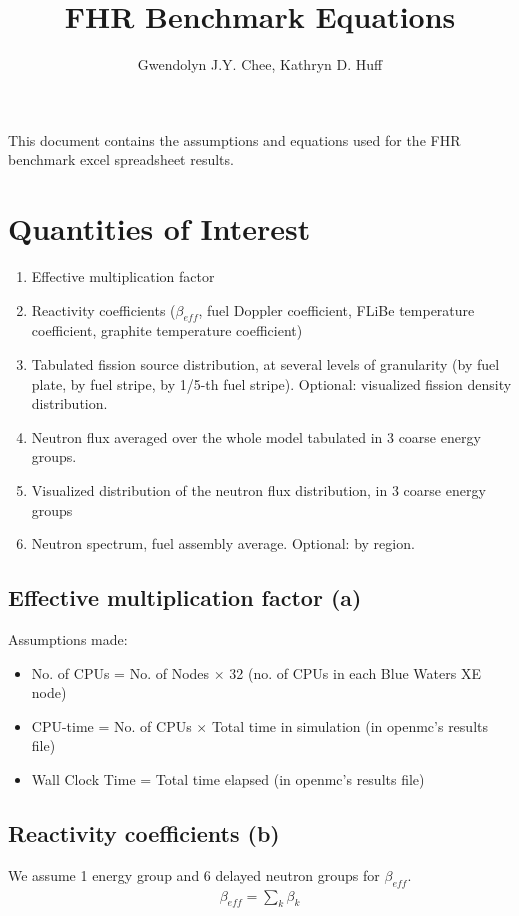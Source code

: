 \documentclass[letterpaper,11pt]{article}
\author{Gwendolyn J.Y. Chee, Kathryn D. Huff}
\title{FHR Benchmark Equations }
\begin{document}
\maketitle
\hrulefill
\onehalfspacing

This document contains the assumptions and equations used for the FHR 
benchmark excel spreadsheet results. 

\section{Quantities of Interest}
\begin{enumerate}[label=(\alph*)]
    \item Effective multiplication factor 
    \item Reactivity coefficients ($\beta_{eff}$, fuel Doppler coefficient, FLiBe 
    temperature coefficient, graphite temperature coefficient)
    \item Tabulated fission source distribution, at several levels of granularity 
    (by fuel plate, by fuel stripe, by 1/5-th fuel stripe). Optional: visualized fission 
    density distribution.
    \item Neutron flux averaged over the whole model tabulated in 3 coarse energy groups. 
    \item Visualized distribution of the neutron flux distribution, in 3 coarse energy groups
    \item Neutron spectrum, fuel assembly average. Optional: by region.
\end{enumerate}

\subsection{Effective multiplication factor (a)}
Assumptions made: 
\begin{itemize}
    \item No. of CPUs = No. of Nodes $\times$ 32 (no. of CPUs in each Blue Waters XE node)
    \item CPU-time = No. of CPUs $\times$ Total time in simulation (in openmc's results file)
    \item Wall Clock Time = Total time elapsed (in openmc's results file)
\end{itemize}

\subsection{Reactivity coefficients (b)}
We assume 1 energy group and 6 delayed neutron groups for $\beta_{eff}$. 
\begin{align*}
    \beta_{eff} = \sum_k \beta_k
\end{align*}
\end{document}
